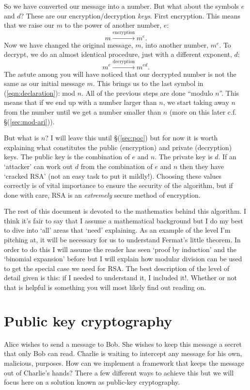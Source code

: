 \documentclass[]{scrartcl}
\theoremstyle{definition}
\renewcommand{\sec}[1]{\S \ref{#1}}
\let\oldref\ref
\renewcommand{\ref}[1]{(\oldref{#1})}
\begin{document}
So we have converted our message into a number. But what about the symbols $e$ and $d$? These are our encryption/decryption \textit{keys}. First encryption. This means that we raise our $m$ to the power of another number, $e$:
\begin{equation}
    m\xrightarrow{\text{encryption}}m^e.
\end{equation}
Now we have changed the original message, $m$, into another number, $m^e$. To decrypt, we do an almost identical procedure, just with a different exponent, $d$:
\begin{equation}
    m^e\xrightarrow{\text{decryption}}m^{ed}.
\end{equation}
The astute among you will have noticed that our decrypted number is not the same as our initial message $m$. This brings us to the last symbol in \ref{eqn:declaration}: mod $n$. All of the previous steps are done ``modulo $n$''. This means that if we end up with a number larger than $n$, we start taking away $n$ from the number until we get a number smaller than $n$ (more on this later c.f. \sec{sec:mod-ari}).

But what is $n$? I will leave this until \sec{sec:poc} but for now it is worth explaining what constitutes the public (encryption) and private (decryption) keys. The public key is the combination of $e$ and $n$. The private key is $d$. If an `attacker' can work out $d$ from the combination of $e$ and $n$ then they have `cracked RSA' (not an easy task to put it mildly!). Choosing these values correctly is of vital importance to ensure the security of the algorithm, but if done with care, RSA is an \textit{extremely} secure method of encryption.

The rest of this document is devoted to the mathematics behind this algorithm. I think it's fair to say that I assume a mathematical background but I do my best to dive into `all' areas that `need' explaining. As an example of the level I'm pitching at, it will be necessary for us to understand Fermat's little theorem. In order to do this I will assume the reader has seen `proof by induction' and the `binomial expansion' before but I will explain how modular division can be used to get the special case we need for RSA. The best description of the level of detail given is this: if I needed to understand it, I included it!. Whether or not that is helpful is something you will most likely find out reading on.

\section{Public key cryptography}\label{sec:pkc}
Alice wishes to send a message to Bob. She wishes to keep this message a secret that only Bob can read. Charlie is waiting to intercept any message for his own, malicious, purposes. How can we implement a framework that keeps the message out of Charlie's hands? There a few different ways to achieve this but we will focus here on a solution known as public-key cryptography.
\end{document}
